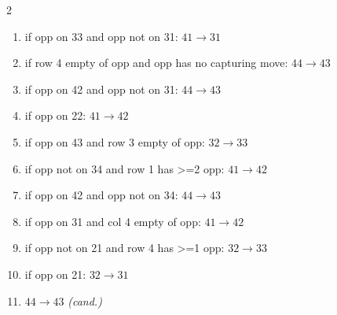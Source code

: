 \begin{multicols}{2}
\begin{tikzpicture}[scale=0.24]
\end{tikzpicture}
\nopagebreak\begin{enumerate}[topsep=1pt,itemsep=0pt,parsep=0pt,leftmargin=2.2em,label=\arabic*.]
\item if opp on 33 and opp not on 31: $41\!\to\!31$
\item if row 4 empty of opp and opp has no capturing move: $44\!\to\!43$
\item if opp on 42 and opp not on 31: $44\!\to\!43$
\item if opp on 22: $41\!\to\!42$
\item if opp on 43 and row 3 empty of opp: $32\!\to\!33$
\item if opp not on 34 and row 1 has >=2 opp: $41\!\to\!42$
\item if opp on 42 and opp not on 34: $44\!\to\!43$
\item if opp on 31 and col 4 empty of opp: $41\!\to\!42$
\item if opp not on 21 and row 4 has >=1 opp: $32\!\to\!33$
\item if opp on 21: $32\!\to\!31$
\item $44\!\to\!43$ \hfill\textit{(cand.)}
\end{enumerate}\smallskip
\end{multicols}